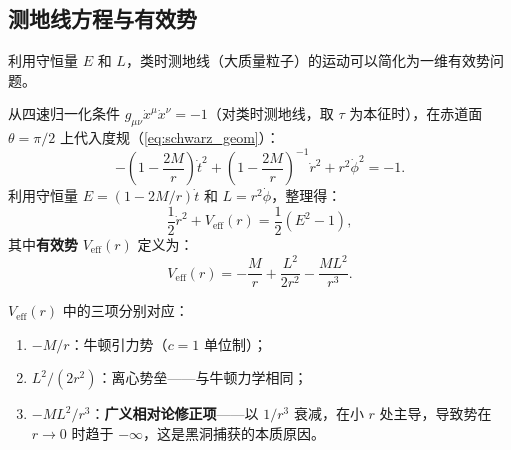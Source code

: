 \subsection{测地线方程与有效势}

利用守恒量 $E$ 和 $L$，类时测地线（大质量粒子）的运动可以简化为一维有效势问题。

从四速归一化条件 $g_{\mu\nu}\dot x^\mu\dot x^\nu = -1$（对类时测地线，取 $\tau$ 为本征时），在赤道面 $\theta=\pi/2$ 上代入度规（\ref{eq:schwarz_geom}）：
\begin{equation}
    -\left(1-\frac{2M}{r}\right)\dot t^2 + \left(1-\frac{2M}{r}\right)^{-1}\dot r^2 + r^2\dot\phi^2 = -1.
\end{equation}
利用守恒量 $E = (1-2M/r)\dot t$ 和 $L = r^2\dot\phi$，整理得：
\begin{equation}
    \boxed{\frac{1}{2}\dot r^2 + V_{\text{eff}}(r) = \frac{1}{2}(E^2 - 1)},
    \label{eq:eff_potential}
\end{equation}
其中\textbf{有效势} $V_{\text{eff}}(r)$ 定义为：
\begin{equation}
    \boxed{V_{\text{eff}}(r) = -\frac{M}{r} + \frac{L^2}{2r^2} - \frac{ML^2}{r^3}}.
    \label{eq:Veff}
\end{equation}

\begin{note}[有效势各项的物理意义]
$V_{\text{eff}}(r)$ 中的三项分别对应：
\begin{enumerate}
    \item $-M/r$：牛顿引力势（$c=1$ 单位制）；
    \item $L^2/(2r^2)$：离心势垒——与牛顿力学相同；
    \item $-ML^2/r^3$：\textbf{广义相对论修正项}——以 $1/r^3$ 衰减，在小 $r$ 处主导，导致势在 $r\to 0$ 时趋于 $-\infty$，这是黑洞捕获的本质原因。
\end{enumerate}
\end{note}

